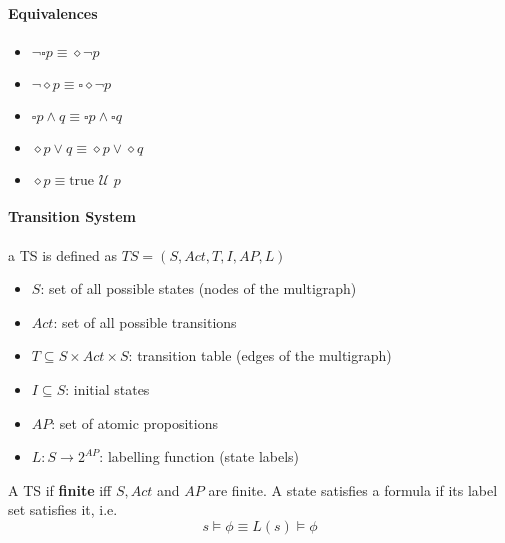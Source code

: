 \documentclass{article}
\newcommand{\U}{\,\,\mathcal{U}\,\,}
\begin{document}
\paragraph{Equivalences}
\begin{itemize}
\item $\neg\square p \equiv \diamond\neg p$
\item $\neg\diamond p \equiv \square \diamond\neg p$
\item $\square p \land q \equiv \square p \land \square q$ 
\item $\diamond p \lor q \equiv \diamond p \lor \diamond q$ 
\item $\diamond p \equiv \text{true} \U p$
\end{itemize}

\paragraph{Transition System} a TS is defined as $TS = (S, Act, T, I, AP, L)$
\begin{itemize}
\item $S$: set of all possible states (nodes of the multigraph)
\item $Act$: set of all possible transitions
\item $T \subseteq S \times Act \times S$: transition table (edges of the multigraph)
\item $I \subseteq S$: initial states
\item $AP$: set of atomic propositions
\item $L: S\to 2^{AP}$: labelling function (state labels)
\end{itemize}
A TS if \textbf{finite} iff $S, Act$ and $AP$ are finite.
A state satisfies a formula if its label set satisfies it, i.e.
\[
  s \vDash \phi \equiv L(s) \vDash \phi
\]
\end{document}
